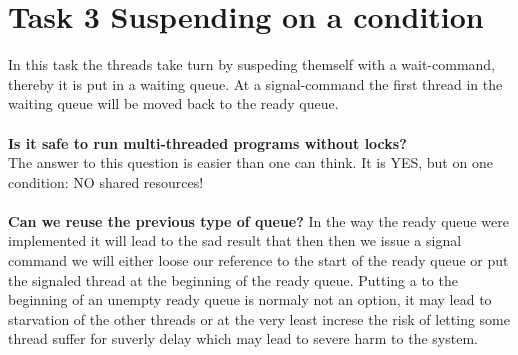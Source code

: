 \documentclass[10pt,a4paper]{article}
\begin{document}
\section*{Task 3 Suspending on a condition}
In this task the threads take turn by suspeding themself with a wait-command, thereby it is put in a waiting queue. At a signal-command the first thread in the waiting queue will be moved back to the ready queue.\\
\\
\textbf{Is it safe to run multi-threaded programs without locks?}\\
The answer to this question is easier than one can think. It is YES, but on one condition: NO shared resources!\\
\\
\textbf{Can we reuse the previous type of queue?}
In the way the ready queue were implemented it will lead to the sad result that then then we issue a signal command we will either loose our reference to the start of the ready queue or put the signaled thread at the beginning of the ready queue. Putting a to the beginning of an unempty ready queue is normaly not an option, it may lead to starvation of the other threads or at the very least increse the risk of letting some thread suffer for suverly delay which may lead to severe harm to the system.
\begin{lslisting}
typedef struct green_thread_queue {
  struct green_t *next;
  struct green_t *end;
\end{lslisting}
\end{document}
